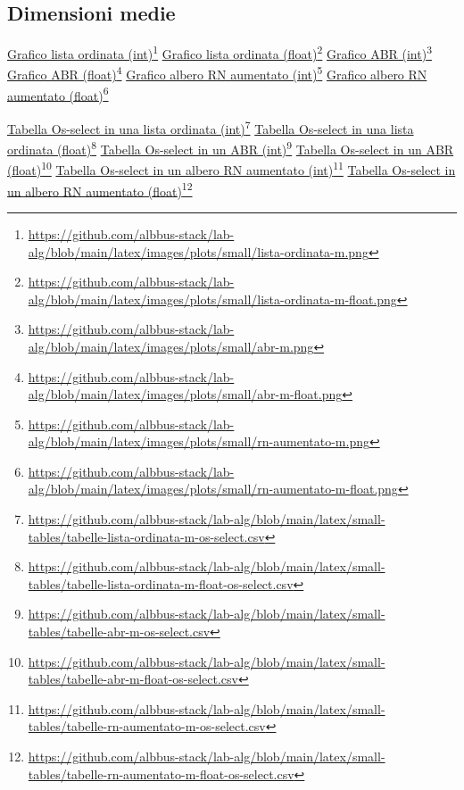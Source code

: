 \documentclass[onecolumn]{article}
\newcommand\anchor[2]{%
  \href{#2}{#1}\footnote{\url{#2}}%
}
\begin{document}
\newpage
\subsection{Dimensioni medie}

\anchor{Grafico lista ordinata (int)}{https://github.com/albbus-stack/lab-alg/blob/main/latex/images/plots/small/lista-ordinata-m.png} \label{label:lista-ordinata-m}
\newline
\anchor{Grafico lista ordinata (float)}{https://github.com/albbus-stack/lab-alg/blob/main/latex/images/plots/small/lista-ordinata-m-float.png} \label{label:lista-ordinata-m-float}
\newline
\anchor{Grafico ABR (int)}{https://github.com/albbus-stack/lab-alg/blob/main/latex/images/plots/small/abr-m.png} \label{label:abr-m}
\newline
\anchor{Grafico ABR (float)}{https://github.com/albbus-stack/lab-alg/blob/main/latex/images/plots/small/abr-m-float.png} \label{label:abr-m-float}
\newline
\anchor{Grafico albero RN aumentato (int)}{https://github.com/albbus-stack/lab-alg/blob/main/latex/images/plots/small/rn-aumentato-m.png} \label{label:rn-aumentato-m}
\newline
\anchor{Grafico albero RN aumentato (float)}{https://github.com/albbus-stack/lab-alg/blob/main/latex/images/plots/small/rn-aumentato-m-float.png} \label{label:rn-aumentato-m-float}

\newpage

\noindent
\anchor{Tabella Os-select in una lista ordinata (int)}{https://github.com/albbus-stack/lab-alg/blob/main/latex/small-tables/tabelle-lista-ordinata-m-os-select.csv} \label{label:lista-ordinata-m-os-select}
\newline
\anchor{Tabella Os-select in una lista ordinata (float)}{https://github.com/albbus-stack/lab-alg/blob/main/latex/small-tables/tabelle-lista-ordinata-m-float-os-select.csv} \label{label:lista-ordinata-m-float-os-select}
\newline
\anchor{Tabella Os-select in un ABR (int)}{https://github.com/albbus-stack/lab-alg/blob/main/latex/small-tables/tabelle-abr-m-os-select.csv} \label{label:abr-m-os-select}
\newline
\anchor{Tabella Os-select in un ABR (float)}{https://github.com/albbus-stack/lab-alg/blob/main/latex/small-tables/tabelle-abr-m-float-os-select.csv} \label{label:abr-m-float-os-select}
\newline
\anchor{Tabella Os-select in un albero RN aumentato (int)}{https://github.com/albbus-stack/lab-alg/blob/main/latex/small-tables/tabelle-rn-aumentato-m-os-select.csv} \label{label:rn-aumentato-m-os-select}
\newline
\anchor{Tabella Os-select in un albero RN aumentato (float)}{https://github.com/albbus-stack/lab-alg/blob/main/latex/small-tables/tabelle-rn-aumentato-m-float-os-select.csv} \label{label:rn-aumentato-m-float-os-select}
\end{document}
